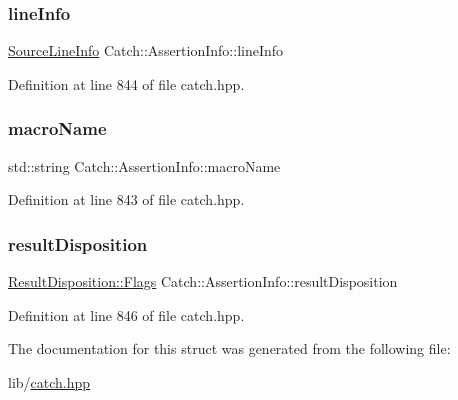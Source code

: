 \hypertarget{struct_catch_1_1_assertion_info_a17bdbb404ba12658034f833be2f4c3e7}{}\label{struct_catch_1_1_assertion_info_a17bdbb404ba12658034f833be2f4c3e7} 
\subsubsection{\texorpdfstring{line\+Info}{lineInfo}}
{\footnotesize\ttfamily \hyperlink{struct_catch_1_1_source_line_info}{Source\+Line\+Info} Catch\+::\+Assertion\+Info\+::line\+Info}



Definition at line 844 of file catch.\+hpp.

\hypertarget{struct_catch_1_1_assertion_info_ac2e59e8c89e00eb3390768f50d540b18}{}\label{struct_catch_1_1_assertion_info_ac2e59e8c89e00eb3390768f50d540b18} 
\subsubsection{\texorpdfstring{macro\+Name}{macroName}}
{\footnotesize\ttfamily std\+::string Catch\+::\+Assertion\+Info\+::macro\+Name}



Definition at line 843 of file catch.\+hpp.

\hypertarget{struct_catch_1_1_assertion_info_a60353b3632ab2f827162f2b2d6911073}{}\label{struct_catch_1_1_assertion_info_a60353b3632ab2f827162f2b2d6911073} 
\subsubsection{\texorpdfstring{result\+Disposition}{resultDisposition}}
{\footnotesize\ttfamily \hyperlink{struct_catch_1_1_result_disposition_a3396cad6e2259af326b3aae93e23e9d8}{Result\+Disposition\+::\+Flags} Catch\+::\+Assertion\+Info\+::result\+Disposition}



Definition at line 846 of file catch.\+hpp.



The documentation for this struct was generated from the following file\+:\begin{DoxyCompactItemize}
\item 
lib/\hyperlink{catch_8hpp}{catch.\+hpp}\end{DoxyCompactItemize}
